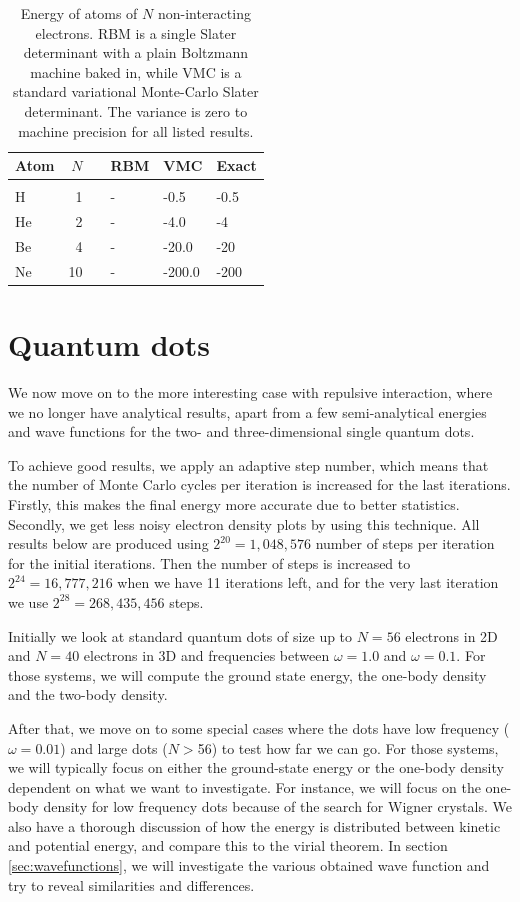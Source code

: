 \begin{table} [H]
	\caption{Energy of atoms of $N$ non-interacting electrons. RBM is a single Slater determinant with a plain Boltzmann machine baked in, while VMC is a standard variational Monte-Carlo Slater determinant. The variance is zero to machine precision for all listed results. }
	\label{tab:atomswointeraction}
	\begin{tabularx}{\textwidth}{lrrR{3.5cm}R{3.5cm}R{3.5cm}} \hline\hline
		Atom & $N$ & \makecell{\\ \phantom{=}} & RBM & VMC & Exact \\ \hline \\
		
		H & 1 && - & -0.5 & -0.5 \\
		He & 2 && - & -4.0 & -4 \\
		Be & 4 && - & -20.0 & -20 \\
		Ne & 10 && - & -200.0 & -200 \\ \hline\hline
	\end{tabularx}
\end{table}
\fi

\newpage
\section{Quantum dots}
We now move on to the more interesting case with repulsive interaction, where we no longer have analytical results, apart from a few semi-analytical energies and wave functions  for the two- and three-dimensional single quantum dots.

To achieve good results, we apply an adaptive step number, which means that the number of Monte Carlo cycles per iteration is increased for the last iterations. Firstly, this makes the final energy more accurate due to better statistics. Secondly, we get less noisy electron density plots by using this technique. All results below are produced using $2^{20}=1,048,576$ number of steps per iteration for the initial iterations. Then the number of steps is increased to $2^{24}=16,777,216$ when we have 11 iterations left, and for the very last iteration we use $2^{28}=268,435,456$ steps.

Initially we look at standard quantum dots of size up to $N=56$ electrons in 2D and $N=40$ electrons in 3D and frequencies between $\omega=1.0$ and $\omega=0.1$. For those systems, we will compute the ground state energy, the one-body density and the two-body density. 

After that, we move on to some special cases where the dots have low frequency ($\omega=0.01$) and large dots ($N>$56) to test how far we can go. For those systems, we will typically focus on either the ground-state energy or the one-body density dependent on what we want to investigate. For instance, we will focus on the one-body density for low frequency dots because of the search for Wigner crystals. We also have a thorough discussion of how the energy is distributed between kinetic and potential energy, and compare this to the virial theorem. In section \ref{sec:wavefunctions}, we will investigate the various obtained wave function and try to reveal similarities and differences.

